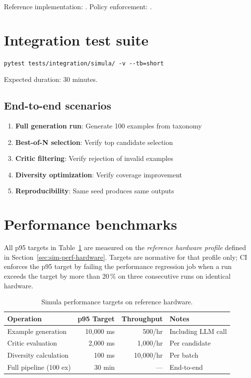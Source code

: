 \documentclass[12pt,a4paper,twoside]{report}
\begin{document}
\noindent
Reference implementation:
.
Policy enforcement: .

\section{Integration test suite}

\begin{lstlisting}[basicstyle=\ttfamily\small]
pytest tests/integration/simula/ -v --tb=short
\end{lstlisting}

Expected duration: 30 minutes.

\subsection{End-to-end scenarios}

\begin{enumerate}
\item \textbf{Full generation run}: Generate 100 examples from taxonomy
\item \textbf{Best-of-N selection}: Verify top candidate selection
\item \textbf{Critic filtering}: Verify rejection of invalid examples
\item \textbf{Diversity optimization}: Verify coverage improvement
\item \textbf{Reproducibility}: Same seed produces same outputs
\end{enumerate}

\section{Performance benchmarks}

All p95 targets in Table~\ref{tab:sim-perf-targets} are measured on the
\emph{reference hardware profile} defined in
Section~\ref{sec:sim-perf-hardware}. Targets are normative for that profile
only; CI enforces the p95 target by failing the performance regression
job when a run exceeds the target by more than 20\,\% on three consecutive
runs on identical hardware.

\begin{table}[htbp]
\centering
\caption{Simula performance targets on reference hardware.}
\label{tab:sim-perf-targets}
\footnotesize
\begin{tabularx}{\linewidth}{@{}l r r X@{}}
\toprule
\textbf{Operation} & \textbf{p95 Target} & \textbf{Throughput} & \textbf{Notes} \\ \midrule
Example generation & 10,000 ms & 500/hr & Including LLM call \\
Critic evaluation & 2,000 ms & 1,000/hr & Per candidate \\
Diversity calculation & 100 ms & 10,000/hr & Per batch \\
Full pipeline (100 ex) & 30 min & --- & End-to-end \\
\bottomrule
\end{tabularx}
\end{table}
\end{document}
